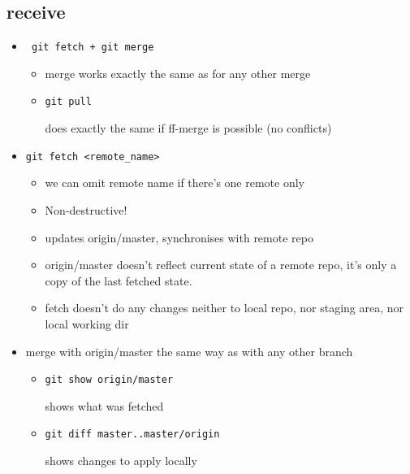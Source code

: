 \documentclass{report}
\begin{document}
\subsection{receive}
\begin{itemize}
\item \begin{verbatim} git fetch + git merge
\end{verbatim}
\begin{itemize} 
\item merge works exactly the same as for any other merge
\item \begin{verbatim}
git pull
\end{verbatim}
does exactly the same if ff-merge is possible (no conflicts)
\end{itemize}

\item \begin{verbatim}
git fetch <remote_name>
\end{verbatim}
\begin{itemize}
\item we can omit remote name if there's one remote only
\item Non-destructive!
\item updates origin/master, synchronises with remote repo
\item origin/master doesn't reflect current state of a remote repo, it's only a copy of the last fetched state.
\item fetch doesn't do any changes neither to local repo, nor staging area, nor local working dir

\end{itemize}

\item merge with origin/master the same way as with any other branch
\begin{itemize}
\item \begin{verbatim}
git show origin/master
\end{verbatim}
shows what was fetched
\item \begin{verbatim}
git diff master..master/origin
\end{verbatim}
shows changes to apply locally

\end{itemize}

\end{itemize}
\end{document}
